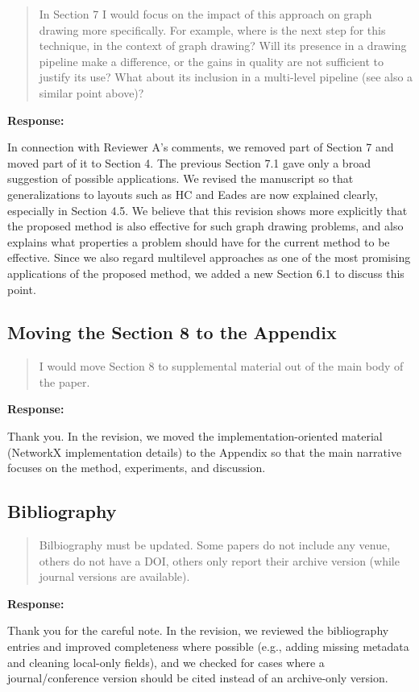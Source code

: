 \documentclass[11pt]{article}
\newcommand{\reviewercomment}[1]{%
  \begin{quote}
  \color{blue}
  #1
  \end{quote}
}
\newenvironment{response}{%
  \noindent\textbf{Response:}%
}{%
  \medskip
}
\begin{document}
\reviewercomment{
  In Section 7 I would focus on the impact of this approach on graph drawing more specifically.
  For example, where is the next step for this technique, in the context of graph drawing?
  Will its presence in a drawing pipeline make a difference, or the gains in quality are not sufficient to justify its use?
  What about its inclusion in a multi-level pipeline (see also a similar point above)?
}

\begin{response}
  In connection with Reviewer A's comments, we removed part of Section 7 and moved part of it to Section 4.
  The previous Section 7.1 gave only a broad suggestion of possible applications. We revised the manuscript so that generalizations to layouts such as HC and Eades are now explained clearly, especially in Section 4.5. We believe that this revision shows more explicitly that the proposed method is also effective for such graph drawing problems, and also explains what properties a problem should have for the current method to be effective.
  Since we also regard multilevel approaches as one of the most promising applications of the proposed method, we added a new Section 6.1 to discuss this point.
\end{response}

\subsection{Moving the Section 8 to the Appendix}

\reviewercomment{
  I would move Section 8 to supplemental material out of the main body of the paper.
}

\begin{response}
  Thank you.
  In the revision, we moved the implementation-oriented material (NetworkX implementation details) to the Appendix so that the main narrative focuses on the method, experiments, and discussion.
\end{response}

\subsection{Bibliography}

\reviewercomment{
  Bilbiography must be updated.
  Some papers do not include any venue, others do not have a DOI, others only report their archive version (while journal versions are available).
}

\begin{response}
  Thank you for the careful note.
  In the revision, we reviewed the bibliography entries and improved completeness where possible (e.g., adding missing metadata and cleaning local-only fields), and we checked for cases where a journal/conference version should be cited instead of an archive-only version.
\end{response}
\end{document}
